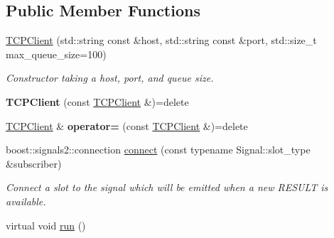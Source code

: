 \subsection*{Public Member Functions}
\begin{DoxyCompactItemize}
\item 
\hypertarget{classquanergy_1_1client_1_1TCPClient_a7caac3128ee9ac21709cdc1541018514}{\hyperlink{classquanergy_1_1client_1_1TCPClient_a7caac3128ee9ac21709cdc1541018514}{T\-C\-P\-Client} (std\-::string const \&host, std\-::string const \&port, std\-::size\-\_\-t max\-\_\-queue\-\_\-size=100)}\label{classquanergy_1_1client_1_1TCPClient_a7caac3128ee9ac21709cdc1541018514}

\begin{DoxyCompactList}\small\item\em Constructor taking a host, port, and queue size. \end{DoxyCompactList}\item 
\hypertarget{classquanergy_1_1client_1_1TCPClient_a47e8a916773370abf09263ab56a4bd85}{{\bfseries T\-C\-P\-Client} (const \hyperlink{classquanergy_1_1client_1_1TCPClient}{T\-C\-P\-Client} \&)=delete}\label{classquanergy_1_1client_1_1TCPClient_a47e8a916773370abf09263ab56a4bd85}

\item 
\hypertarget{classquanergy_1_1client_1_1TCPClient_a25fe677b76c4cfb2bc9b2b9eeb65c088}{\hyperlink{classquanergy_1_1client_1_1TCPClient}{T\-C\-P\-Client} \& {\bfseries operator=} (const \hyperlink{classquanergy_1_1client_1_1TCPClient}{T\-C\-P\-Client} \&)=delete}\label{classquanergy_1_1client_1_1TCPClient_a25fe677b76c4cfb2bc9b2b9eeb65c088}

\item 
\hypertarget{classquanergy_1_1client_1_1TCPClient_a80d8ce7142ef21da286976194becd6a9}{boost\-::signals2\-::connection \hyperlink{classquanergy_1_1client_1_1TCPClient_a80d8ce7142ef21da286976194becd6a9}{connect} (const typename Signal\-::slot\-\_\-type \&subscriber)}\label{classquanergy_1_1client_1_1TCPClient_a80d8ce7142ef21da286976194becd6a9}

\begin{DoxyCompactList}\small\item\em Connect a slot to the signal which will be emitted when a new R\-E\-S\-U\-L\-T is available. \end{DoxyCompactList}\item 
\hypertarget{classquanergy_1_1client_1_1TCPClient_ade508b6561dce937cffbb43390ff23c2}{virtual void \hyperlink{classquanergy_1_1client_1_1TCPClient_ade508b6561dce937cffbb43390ff23c2}{run} ()}\label{classquanergy_1_1client_1_1TCPClient_ade508b6561dce937cffbb43390ff23c2}


\end{DoxyCompactItemize}
